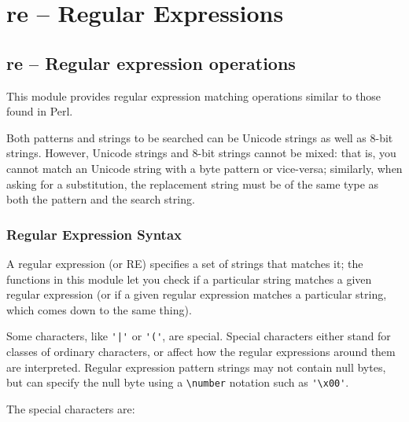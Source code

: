 
\chapter{re -- Regular Expressions}

\section{re -- Regular expression operations}

This module provides regular expression
matching operations similar to those found in Perl.

Both patterns and strings to be searched
can be Unicode strings as well as 8-bit
strings. However, Unicode strings and
8-bit strings cannot be mixed: that is,
you cannot match an Unicode string with
a byte pattern or vice-versa; similarly,
when asking for a substitution, the replacement string must
be of the same type as both the pattern and the search string.


\subsection{Regular Expression Syntax}

A regular expression (or RE) specifies
a set of strings that matches it; the
functions in this module let you check
if a particular string matches a given
regular expression (or if a given regular
expression matches a particular string,
which comes down to the same thing).

Some characters, like \verb+'|'+ or \verb+'('+, are
special. Special characters either stand
for classes of ordinary characters, or
affect how the regular expressions around
them are interpreted. Regular expression
pattern strings may not contain null bytes,
but can specify the null byte using a \verb+\number+
notation such as \verb+'\x00'+.

The special characters are:

